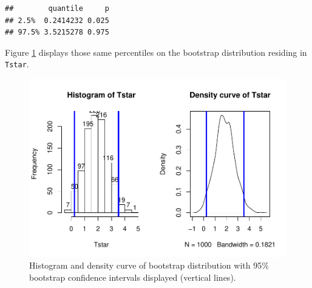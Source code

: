 \documentclass[]{book}
\newenvironment{Shaded}{\begin{snugshade}}{\end{snugshade}}
\newcommand{\KeywordTok}[1]{\textcolor[rgb]{0.13,0.29,0.53}{\textbf{{#1}}}}
\newcommand{\DataTypeTok}[1]{\textcolor[rgb]{0.13,0.29,0.53}{{#1}}}
\newcommand{\DecValTok}[1]{\textcolor[rgb]{0.00,0.00,0.81}{{#1}}}
\newcommand{\StringTok}[1]{\textcolor[rgb]{0.31,0.60,0.02}{{#1}}}
\newcommand{\NormalTok}[1]{{#1}}
\begin{document}
\begin{verbatim}
##        quantile     p
## 2.5%  0.2414232 0.025
## 97.5% 3.5215278 0.975
\end{verbatim}

Figure \ref{fig:Figure2-19} displays those same percentiles on the
bootstrap distribution residing in \texttt{Tstar}.




\begin{Shaded}
\end{Shaded}

\begin{figure}[htbp]
\centering
\includegraphics{GreenwoodBanner_files/figure-latex/Figure2-19-1.pdf}
\caption{\label{fig:Figure2-19}Histogram and density curve of bootstrap distribution with
95\% bootstrap confidence intervals displayed (vertical lines).}
\end{figure}
\end{document}
